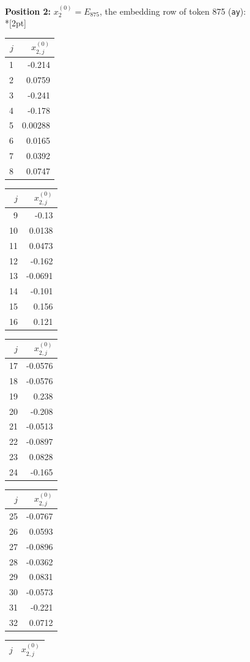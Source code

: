 \noindent \textbf{Position 2:} $x^{(0)}_{2} = E_{875}$, the embedding row of token 875 (\texttt{ay}):\\*[2pt]
{\tablefont \begin{tabular}[t]{r|r}
$j$ & $x^{(0)}_{2,j}$ \\\hline
1 & -0.214 \\
2 & 0.0759 \\
3 & -0.241 \\
4 & -0.178 \\
5 & 0.00288 \\
6 & 0.0165 \\
7 & 0.0392 \\
8 & 0.0747
\end{tabular}\kern4pt
\begin{tabular}[t]{r|r}
$j$ & $x^{(0)}_{2,j}$ \\\hline
9 & -0.13 \\
10 & 0.0138 \\
11 & 0.0473 \\
12 & -0.162 \\
13 & -0.0691 \\
14 & -0.101 \\
15 & 0.156 \\
16 & 0.121
\end{tabular}\kern4pt
\begin{tabular}[t]{r|r}
$j$ & $x^{(0)}_{2,j}$ \\\hline
17 & -0.0576 \\
18 & -0.0576 \\
19 & 0.238 \\
20 & -0.208 \\
21 & -0.0513 \\
22 & -0.0897 \\
23 & 0.0828 \\
24 & -0.165
\end{tabular}\kern4pt
\begin{tabular}[t]{r|r}
$j$ & $x^{(0)}_{2,j}$ \\\hline
25 & -0.0767 \\
26 & 0.0593 \\
27 & -0.0896 \\
28 & -0.0362 \\
29 & 0.0831 \\
30 & -0.0573 \\
31 & -0.221 \\
32 & 0.0712
\end{tabular}\kern4pt
\begin{tabular}[t]{r|r}
$j$ & $x^{(0)}_{2,j}$ \\\hline

\end{tabular}}
